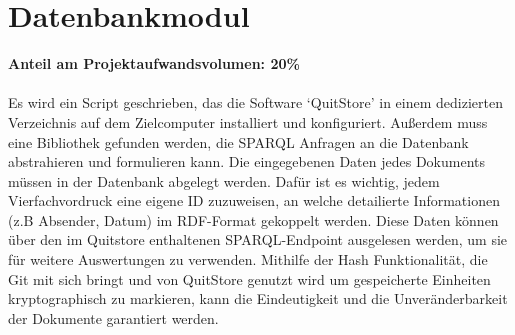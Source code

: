 \section{Datenbankmodul}
\textbf{Anteil am Projektaufwandsvolumen: 20\%}
\\ \\
Es wird ein Script geschrieben, das die Software `QuitStore' in einem
dedizierten Verzeichnis auf dem Zielcomputer installiert und konfiguriert.
Außerdem muss eine Bibliothek gefunden werden, die SPARQL Anfragen an die
Datenbank abstrahieren und formulieren kann.
Die eingegebenen Daten jedes Dokuments müssen in der Datenbank abgelegt werden.
Dafür ist es wichtig, jedem Vierfachvordruck eine eigene ID zuzuweisen, an welche detailierte Informationen (z.B Absender, Datum) im RDF-Format gekoppelt werden.
Diese Daten können über den im Quitstore enthaltenen SPARQL-Endpoint ausgelesen werden, um sie für weitere Auswertungen zu verwenden.
Mithilfe der Hash Funktionalität, die Git mit sich bringt und von QuitStore
genutzt wird um gespeicherte Einheiten kryptographisch zu markieren, kann die
Eindeutigkeit und die Unveränderbarkeit der Dokumente garantiert werden. 

